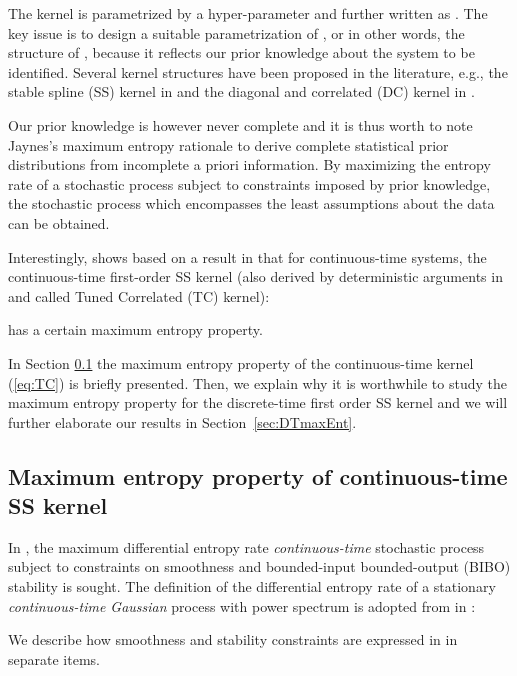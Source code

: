 \documentclass{article}
\begin{document}
The kernel  is parametrized by a hyper-parameter 
and further written as . The key issue is to design a
suitable parametrization of , or in other words, the
structure of , because it reflects our prior knowledge
about the system to be identified. Several kernel structures  have
been proposed  in the literature, e.g., the
stable spline (SS) kernel in \cite{PN10a} and the diagonal and
correlated (DC) kernel in \cite{COL12a}.

Our prior knowledge is however never complete and it is thus worth
to note Jaynes's maximum entropy rationale \cite{jaynes} to derive
complete statistical prior distributions from incomplete a priori
information.  By maximizing the entropy rate of a stochastic process
subject to constraints imposed by prior knowledge, the stochastic
process which encompasses the least assumptions about the data can
be obtained.



Interestingly, \cite{pillonetto2011} shows based on a result in
\cite{DeTL98} that for continuous-time systems, the continuous-time
first-order SS kernel (also derived by  deterministic arguments in
\cite{COL12a} and called Tuned Correlated (TC) kernel):

has a certain maximum entropy property.

In Section \ref{sec:CTmaxEnt} the maximum entropy
property of the continuous-time kernel (\ref{eq:TC}) is briefly presented.
Then, we explain why it is worthwhile to study the maximum entropy
property for the discrete-time first order SS kernel
 and we will further elaborate our results in Section~\ref{sec:DTmaxEnt}.




\subsection{Maximum entropy property of continuous-time SS kernel}
\label{sec:CTmaxEnt}

In \cite{pillonetto2011}, the maximum differential entropy rate
\emph{continuous-time} stochastic process subject to constraints on
smoothness and bounded-input bounded-output (BIBO) stability is
sought. The definition of the differential entropy rate of a stationary \emph{continuous-time
Gaussian} process  with power spectrum  is adopted from \cite{DeTL98} in \cite{pillonetto2011}:

 We describe how smoothness and stability constraints are expressed in \cite{pillonetto2011} in separate items.
\end{document}
